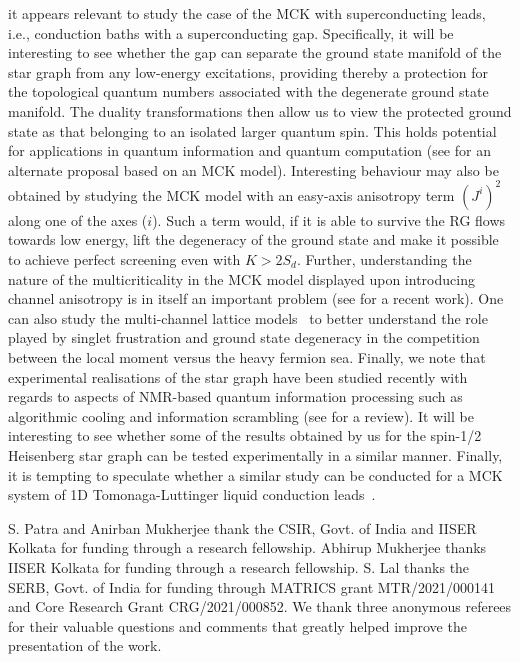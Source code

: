 \documentclass[reprint,prb,superscriptaddress]{revtex4-2}
\begin{document}
it appears relevant to study the case of the MCK with superconducting leads, i.e., conduction baths with a superconducting gap. Specifically, it will be interesting to see whether the gap can separate the ground state manifold of the star graph from any low-energy excitations, providing thereby a protection for the topological quantum numbers associated with the degenerate ground state manifold. The duality transformations then allow us to view the protected ground state as that belonging to an isolated larger quantum spin. This holds potential for applications in quantum information and quantum computation (see \cite{lopes2020} for an alternate proposal based on an MCK model). Interesting behaviour may also be obtained by studying the MCK model with an easy-axis anisotropy term \(\left(J^i\right)^2\) along one of the axes ($i$).
Such a term would, if it is able to survive the RG flows towards low energy, lift the degeneracy of the ground state and make it possible to achieve perfect screening even with \(K > 2S_d\). Further, understanding the nature of the multicriticality in the MCK model displayed upon introducing channel anisotropy is in itself an important problem (see \cite{zheng2021} for a recent work).
One can also study the multi-channel lattice models~\cite{Piguet1997,shaw_1998} to better understand the role played by singlet frustration and ground state degeneracy in the competition between the local moment versus the heavy fermion sea. Finally, we note that experimental realisations of the star graph have been studied recently with regards to aspects of NMR-based quantum information processing such as algorithmic cooling and information scrambling (see \cite{mahesh2021} for a review). It will be interesting to see whether some of the results obtained by us for the spin-1/2 Heisenberg star graph can be tested experimentally in a similar manner. Finally, it is tempting to speculate whether a similar study can be conducted for a MCK system of 1D Tomonaga-Luttinger liquid conduction leads~\cite{lalbosonMCK2010}.

\acknowledgments
S. Patra and Anirban Mukherjee thank the CSIR, Govt. of India and IISER Kolkata for funding through a research fellowship. Abhirup Mukherjee thanks IISER Kolkata for funding through a research fellowship. S. Lal thanks the SERB, Govt. of India for funding through MATRICS grant MTR/2021/000141 and Core Research Grant CRG/2021/000852. We thank three anonymous referees for their valuable questions and comments that greatly helped improve the presentation of the work.



\end{document}
